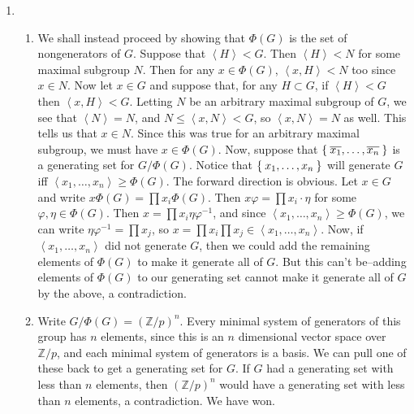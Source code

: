 \documentclass[12pt]{article}
\theoremstyle{definitionstyle}
\def\mbb#1{\mathbb{#1}}
\def \cph{\varphi}
\newcommand{\Z}{\mbb Z}
\newcommand{\gen}[1]{\left\langle #1 \right\rangle}
\begin{document}
\begin{enumerate}[leftmargin=\labelsep]
		\item
		\begin{enumerate}
			\item We shall instead proceed by showing that $\Phi(G)$ is the set of nongenerators of $G$. Suppose that $\gen{H} < G$. Then $\gen{H} < N$ for some maximal subgroup $N$. Then for any $x \in \Phi(G)$, $\gen{x, H} < N$ too since $x \in N$. Now let $x \in G$ and suppose that, for any $H \subset G$, if $\gen{H} < G$ then $\gen{x, H} < G$. Letting $N$ be an arbitrary maximal subgroup of $G$, we see that $\gen{N} = N$, and $N \leq \gen{x, N} < G$, so $\gen{x, N} = N$ as well. This tells us that $x \in N$. Since this was true for an arbitrary maximal subgroup, we must have $x \in \Phi(G)$. Now, suppose that $\Set{\overline{x_1}, \ldots, \overline{x_n}}$ is a generating set for $G / \Phi(G)$. Notice that $\Set{x_1, \ldots, x_n}$ will generate $G$ iff $\gen{x_1, \ldots, x_n} \geq \Phi(G)$. The forward direction is obvious. Let $x \in G$ and write $x\Phi(G) = \prod x_i \Phi(G)$. Then $x \cph = \prod x_i \cdot \eta$ for some $\cph, \eta \in \Phi(G)$. Then $x = \prod x_i \eta \cph^{-1}$, and since $\gen{x_1, \ldots, x_n} \geq \Phi(G)$, we can write $\eta \cph^{-1} = \prod x_j$, so $x = \prod x_i \prod x_j \in \gen{x_1, \ldots, x_n}$. Now, if $\gen{x_1, \ldots, x_n}$ did not generate $G$, then we could add the remaining elements of $\Phi(G)$ to make it generate all of $G$. But this can't be--adding elements of $\Phi(G)$ to our generating set cannot make it generate all of $G$ by the above, a contradiction.
			
			\item Write $G/\Phi(G) = (\Z / p)^n$. Every minimal system of generators of this group has $n$ elements, since this is an $n$ dimensional vector space over $\Z/p$, and each minimal system of generators is a basis. We can pull one of these back to get a generating set for $G$. If $G$ had a generating set with less than $n$ elements, then $(\Z / p)^n$ would have a generating set with less than $n$ elements, a contradiction. We have won.
		\end{enumerate}
	\end{enumerate}
\end{document}

